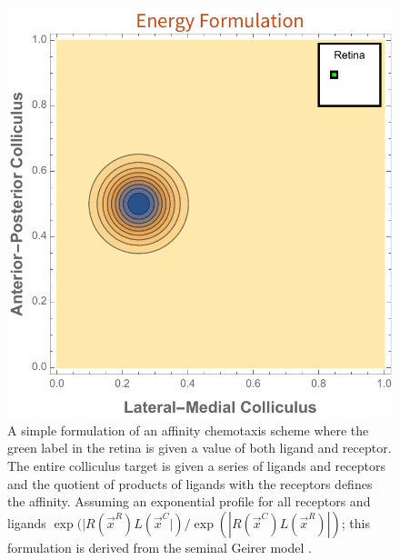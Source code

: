 \begin{figure}[h!]
	\centering
	\includegraphics[width=\textwidth]{images/introduction/energy_chemotaxis_type2}
	\def\c{A simple formulation of an affinity chemotaxis scheme where the green label in the retina is given a value of both ligand and receptor. }
	\caption[\c]{\c The entire colliculus target is given a series of ligands and receptors and the quotient of products of ligands with the receptors defines the affinity. Assuming an exponential profile for all receptors and ligands $\exp(|R(\vec{x}^R)L(\vec{x}^C|)/\exp(|R(\vec{x}^C)L(\vec{x}^R)|)$; this formulation is derived from the seminal Geirer model \cite{Gierer1983-tn}.  \label{fig:affchemotaxistype2}} 
\end{figure}
